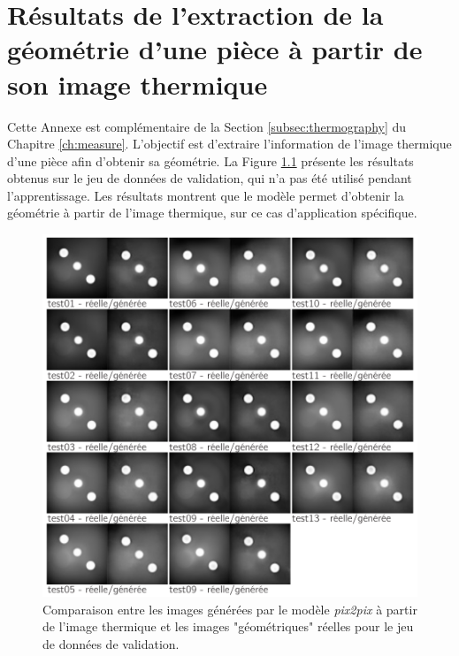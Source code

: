 \begingroup
\clearpage%
\let\clearpage\relax%
\vspace*{-4cm}%
\chapter{Résultats de l'extraction de la géométrie d'une pièce à partir de son image thermique}%
\endgroup
\label{Ann:pix2pix}

\vspace{-1cm}
Cette Annexe est complémentaire de la Section \ref{subsec:thermography} du Chapitre \ref{ch:measure}.
L'objectif est d'extraire l'information de l'image thermique d'une pièce afin d'obtenir sa géométrie.
La Figure \ref{fig:gan_results} présente les résultats obtenus sur le jeu de données de validation, qui n'a pas été utilisé pendant l'apprentissage.
Les résultats montrent que le modèle permet d'obtenir la géométrie à partir de l'image thermique, sur ce cas d'application spécifique.

\vspace{1cm}

\begin{figure}[h!]
	\centering
	\includegraphics[width=\textwidth]{../Chap2/Figures/sapristi_GAN_thermo_geo_testSet.pdf}
	\caption[Images générées par le modèle \textit{pix2pix} à partir de l'image thermique.]{Comparaison entre les images générées par le modèle \textit{pix2pix} à partir de l'image thermique et les images "géométriques" réelles pour le jeu de données de validation.}
	\label{fig:gan_results}
\end{figure}




